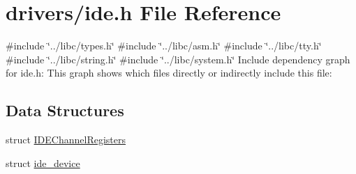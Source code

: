 \hypertarget{a00005}{}\section{drivers/ide.h File Reference}
\label{a00005}
{\ttfamily \#include \char`\"{}../libc/types.\+h\char`\"{}}\newline
{\ttfamily \#include \char`\"{}../libc/asm.\+h\char`\"{}}\newline
{\ttfamily \#include \char`\"{}../libc/tty.\+h\char`\"{}}\newline
{\ttfamily \#include \char`\"{}../libc/string.\+h\char`\"{}}\newline
{\ttfamily \#include \char`\"{}../libc/system.\+h\char`\"{}}\newline
Include dependency graph for ide.\+h\+:
This graph shows which files directly or indirectly include this file\+:
\subsection*{Data Structures}
\begin{DoxyCompactItemize}
\item 
struct \hyperlink{a00069}{I\+D\+E\+Channel\+Registers}
\item 
struct \hyperlink{a00073}{ide\+\_\+device}
\end{DoxyCompactItemize}
